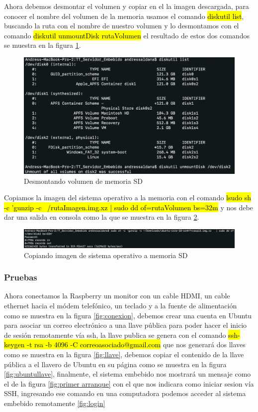 Ahora debemos desmontar el volumen y copiar en el la imagen descargada, para conocer el nombre del volumen de la memoria usamos el comando \hl{diskutil list}, buscando la ruta con el nombre de nuestro volumen y lo desmontamos con el comando \hl{diskutil unmountDisk rutaVolumen} el resultado de estos dos comandos se muestra en la figura \ref{fig:desmonataje}.

\begin{figure}[H]
	\centering
	\includegraphics[scale=.4]{Capitulo5/images/unmount.png}
	\caption{Desmontando volumen de memoria SD}
	\label{fig:desmonataje}
\end{figure} 

Copiamos la imagen del sistema operativo a la memoria con el comando \hl{lsudo sh -c 'gunzip -c ~/rutaImagen.img.xz   | sudo dd of=rutaVolumen bs=32m} y nos debe dar una salida en consola como la que se muestra en la figura \ref{fig:copia}.

\begin{figure}[H]
	\centering
	\includegraphics[scale=.3]{Capitulo5/images/copyimg.png}
	\caption{Copiando imagen de sistema operativo a memoria SD}
	\label{fig:copia}
\end{figure} 

\subsubsection{Pruebas}

Ahora conectamos la Raspberry un monitor con un cable HDMI, un cable ethernet hacia el módem telefónico, un teclado y a la fuente de alimentación como se muestra en la figura \ref{fig:conexion}, debemos crear una cuenta en Ubuntu para asociar un correo electrónico a una llave pública para poder hacer el inicio de sesión remotamente vía ssh, la llave publica se genera con el comando \hl{ssh-keygen -t rsa -b 4096 -C correoasociado@gmail.com} que nos generará dos llaves como se muestra en la figura \ref{fig:llave}, debemos copiar el contenido de la llave pública a el llavero de Ubuntu en su página como se muestra en la figura \ref{fig:ubuntullave}, finalmente, el sistema embebido nos mostrará un mensaje como el de la figura \ref{fig:primer arranque} con el que nos indicara como iniciar sesion vía SSH, ingresando ese comando en una computadora podemos acceder al sistema embebido remotamente \ref{fig:login} 


